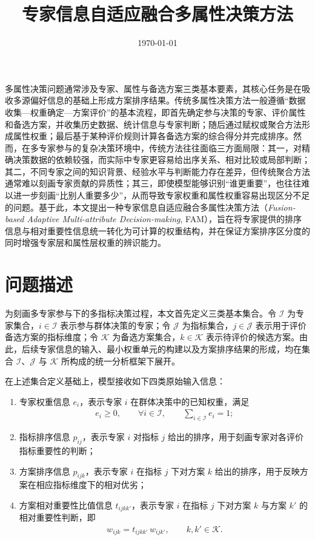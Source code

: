 \documentclass{article}
\title{专家信息自适应融合多属性决策方法}
\date{\today}
\begin{document}
\maketitle


多属性决策问题通常涉及专家、属性与备选方案三类基本要素，其核心任务是在吸收多源偏好信息的基础上形成方案排序结果。传统多属性决策方法一般遵循“数据收集—权重确定—方案评价”的基本流程，即首先确定参与决策的专家、评价属性和备选方案，并收集历史数据、统计信息与专家判断；随后通过赋权或聚合方法形成属性权重；最后基于某种评价规则计算各备选方案的综合得分并完成排序。然而，在多专家参与的复杂决策环境中，传统方法往往面临三方面局限：其一，对精确决策数据的依赖较强，而实际中专家更容易给出序关系、相对比较或局部判断；其二，不同专家之间的知识背景、经验水平与判断能力存在差异，但传统聚合方法通常难以刻画专家贡献的异质性；其三，即使模型能够识别“谁更重要”，也往往难以进一步刻画“比别人重要多少”，从而导致专家权重和属性权重容易出现区分不足的问题。基于此，本文提出一种专家信息自适应融合多属性决策方法（\textit{Fusion-based Adaptive Multi-attribute Decision-making}, FAM），旨在将专家提供的排序信息与相对重要性信息统一转化为可计算的权重结构，并在保证方案排序区分度的同时增强专家层和属性层权重的辨识能力。

\section{问题描述}

为刻画多专家参与下的多指标决策过程，本文首先定义三类基本集合。令 $\mathcal{I}$ 为专家集合，$i\in\mathcal{I}$ 表示参与群体决策的专家；令 $\mathcal{J}$ 为指标集合，$j\in\mathcal{J}$ 表示用于评价备选方案的指标维度；令 $\mathcal{K}$ 为备选方案集合，$k\in\mathcal{K}$ 表示待评价的候选方案。由此，后续专家信息的输入、最小权重单元的构建以及方案排序结果的形成，均在集合 $\mathcal{I}$、$\mathcal{J}$ 与 $\mathcal{K}$ 所构成的统一分析框架下展开。

在上述集合定义基础上，模型接收如下四类原始输入信息：
\begin{enumerate}
    \item 专家权重信息 $e_i$，表示专家 $i$ 在群体决策中的已知权重，满足
    \begin{align}
        e_i\ge 0,\qquad \forall i\in\mathcal{I}, 
        \qquad \sum_{i\in\mathcal{I}} e_i=1;
    \end{align}

    \item 指标排序信息 $p_{ij}$，表示专家 $i$ 对指标 $j$ 给出的排序，用于刻画专家对各评价指标重要性的判断；

    \item 方案排序信息 $p_{ijk}$，表示专家 $i$ 在指标 $j$ 下对方案 $k$ 给出的排序，用于反映方案在相应指标维度下的相对优劣；

    \item 方案相对重要性比值信息 $t_{ijkk'}$，表示专家 $i$ 在指标 $j$ 下对方案 $k$ 与方案 $k'$ 的相对重要性判断，即
    \begin{align}
        w_{ijk}=t_{ijkk'}\,w_{ijk'},\qquad k,k'\in\mathcal{K}.
    \end{align}
\end{enumerate}
\end{document}
